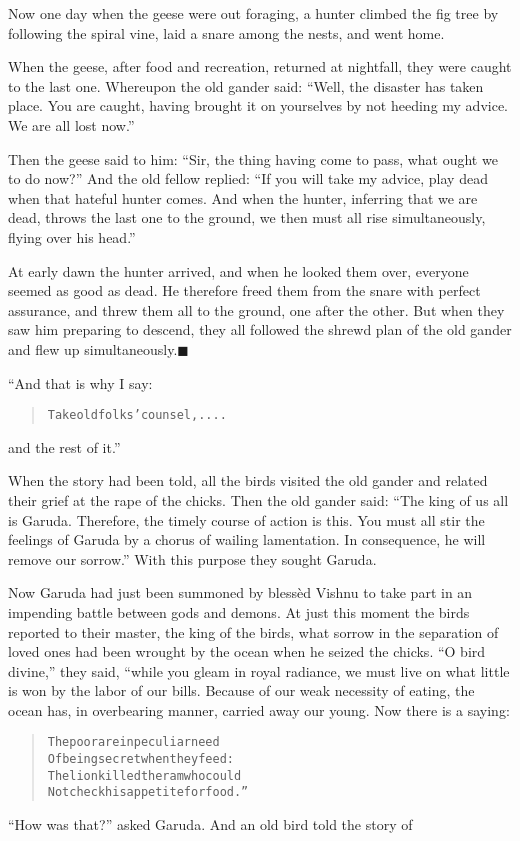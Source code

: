 \documentclass[article, twoside, 14pt]{memoir}
\newcommand{\qed}{\hfill \ensuremath{\blacksquare}}
\renewenvironment{verbatim}{%
\begin{quote}%
\vskip -10pt%
\begin{alltt}\normalfont\large}{\end{alltt}%
\end{quote}%
\vskip -10pt
} %
\begin{document}
Now one day when the geese were out foraging, a hunter climbed the
fig tree by following the spiral vine, laid a snare among the
nests, and went home.

When the geese, after food and recreation, returned at nightfall,
they were caught to the last one. Whereupon the old gander said:
``Well, the disaster has taken place. You are caught, having brought it on yourselves by not heeding my advice. We are all lost now.''

Then the geese said to him:
``Sir, the thing having come to pass, what ought we to do now?''
And the old fellow replied:
``If you will take my advice, play dead when that hateful hunter comes. And when the hunter, inferring that we are dead, throws the last one to the ground, we then must all rise simultaneously, flying over his head.''

At early dawn the hunter arrived, and when he looked them over,
everyone seemed as good as dead. He therefore freed them from the
snare with perfect assurance, and threw them all to the ground, one
after the other. But when they saw him preparing to descend, they
all followed the shrewd plan of the old gander and flew up
simultaneously.\hyperref[s22]{\qed}

“And that is why I say:

\begin{verbatim}
Take old folks' counsel, ....
\end{verbatim}
and the rest of it.”

When the story had been told, all the birds visited the old gander
and related their grief at the rape of the chicks. Then the old
gander said:
``The king of us all is Garuda. Therefore, the timely course of action is this. You must all stir the feelings of Garuda by a chorus of wailing lamentation. In consequence, he will remove our sorrow.''
With this purpose they sought Garuda.

Now Garuda had just been summoned by blessèd Vishnu to take part in
an impending battle between gods and demons. At just this moment
the birds reported to their master, the king of the birds,
what sorrow in the separation of loved ones had been wrought by the
ocean when he seized the chicks. ``O bird divine,'' they said,
“while you gleam in royal radiance, we must live on what little is
won by the labor of our bills. Because of our weak necessity of
eating, the ocean has, in overbearing manner, carried away our
young. Now there is a saying:

\begin{verbatim}
The poor are in peculiar need
Of being secret when they feed:
The lion killed the ram who could
Not check his appetite for food.”
\end{verbatim}
``How was that?'' asked Garuda. And an old bird told the story of
\end{document}
